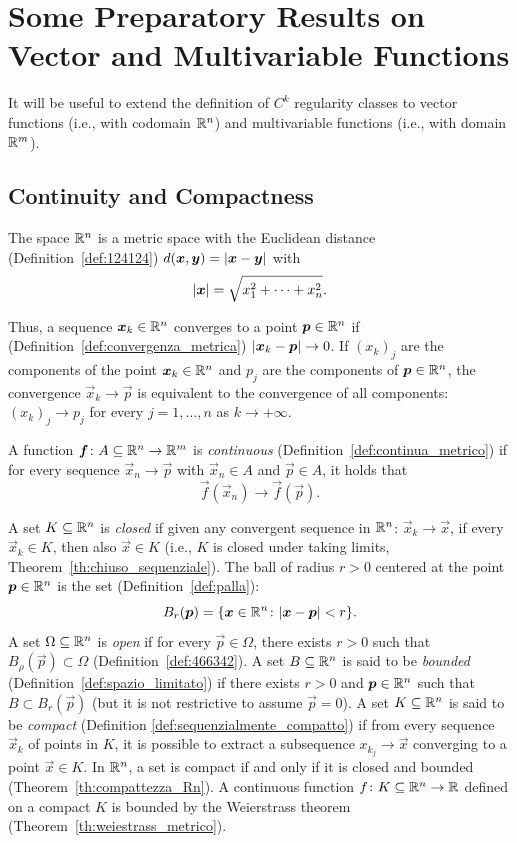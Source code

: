 \section[Vector and Multivariable Functions]{Some Preparatory Results on Vector and Multivariable Functions}

It will be useful to extend the definition of $C^k$ regularity classes to vector
functions (i.e., with codomain ${\mathbb R}^n$) and multivariable functions (i.e., with
domain ${\mathbb R}^m$).

\subsection{Continuity and Compactness}

The space ${\mathbb R}^n$ is a metric space with the Euclidean distance
(Definition~\ref{def:124124})
$d(\boldsymbol x, \boldsymbol y) = {\left|\boldsymbol x- \boldsymbol y\right|}$ with 
\[
 {\left|\boldsymbol x\right|} = \sqrt{x_1^2 + \dots + x_n^2}.  
\] 

Thus, a sequence $\boldsymbol x_k\in {\mathbb R}^n$ converges to a point $\boldsymbol p\in {\mathbb R}^n$ if
(Definition~\ref{def:convergenza_metrica})
${\left|\boldsymbol x_k - \boldsymbol p\right|}\to 0$.
If $(x_k)_j$ are the components of the point $\boldsymbol x_k\in {\mathbb R}^n$ and 
$p_j$ are the components of $\boldsymbol p\in {\mathbb R}^n$, the convergence 
$\vec x_k \to \vec p$ is equivalent to the convergence of 
all components: $(x_k)_j \to p_j$ for every $j=1,\dots,n$
as $k\to +\infty$.

A function $\boldsymbol f\colon A \subseteq {\mathbb R}^n\to {\mathbb R}^m$ 
is \emph{continuous} 
(Definition~\ref{def:continua_metrico})
if for every sequence $\vec x_n \to \vec p$ with 
$\vec x_n\in A$ and $\vec p\in A$, it holds that 
\[
  \vec f(\vec x_n) \to \vec f(\vec p).
\]

A set $K\subseteq {\mathbb R}^n$ is \emph{closed}%
if given any convergent sequence in ${\mathbb R}^n$: $\vec x_k \to \vec x$, if every
$\vec x_k\in K$, then also
$\vec x \in K$ (i.e., $K$ is closed under taking limits,
Theorem~\ref{th:chiuso_sequenziale}).
The ball of radius $r>0$ centered at the point $\boldsymbol p\in {\mathbb R}^n$ 
is the set (Definition~\ref{def:palla}):
\[
  B_r(\boldsymbol p) = {\left\{ \boldsymbol x \in {\mathbb R}^n\colon {\left|\boldsymbol x - \boldsymbol p\right|}< r \right\}}.  
\]
A set $\Omega\subseteq {\mathbb R}^n$ is \emph{open}
if for every $\vec p\in \Omega$, there exists $r>0$ such that $B_\rho(\vec p)
\subset \Omega$
(Definition~\ref{def:466342}).
A set $B\subseteq {\mathbb R}^n$ is said to be \emph{bounded}
(Definition~\ref{def:spazio_limitato})
if there exists $r>0$ and $\boldsymbol p\in{\mathbb R}^n$ such that $B\subset B_r(\vec p)$ 
(but it is not restrictive to assume $\vec p=0$).
A set $K\subseteq {\mathbb R}^n$ is said to be \emph{compact} 
(Definition \ref{def:sequenzialmente_compatto}) if from every sequence 
$\vec x_k$ of points in $K$, it is possible to extract a subsequence $x_{k_j}
\to \vec x$
converging to a point $\vec x \in K$.
In ${\mathbb R}^n$, a set is compact if and only if it is closed and bounded
(Theorem~\ref{th:compattezza_Rn}).
A continuous function $f\colon K\subseteq {\mathbb R}^n\to{\mathbb R}$ defined
on a compact $K$ is bounded by the Weierstrass theorem
(Theorem~\ref{th:weiestrass_metrico}).


